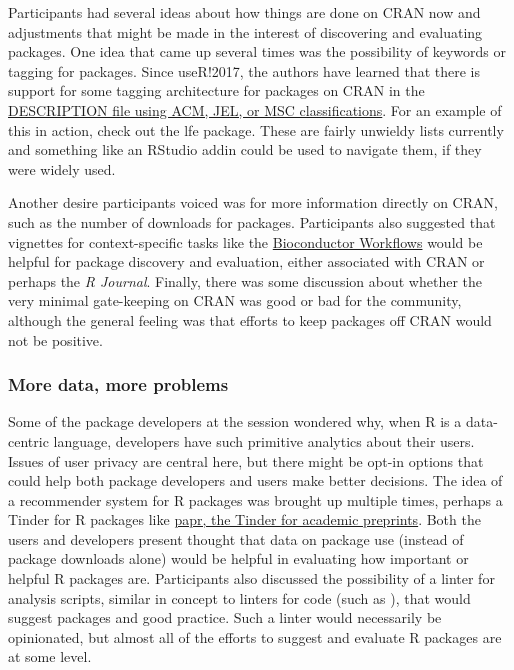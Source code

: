 Participants had several ideas about how things are done on CRAN now and
adjustments that might be made in the interest of discovering and
evaluating packages. One idea that came up several times was the
possibility of keywords or tagging for packages. Since useR!2017, the
authors have learned that there is support for some tagging architecture
for packages on CRAN in the
\href{https://cran.r-project.org/doc/manuals/r-release/R-exts.html\#The-DESCRIPTION-file}{DESCRIPTION
file using ACM, JEL, or MSC classifications}. For an example of this in
action, check out the lfe \citep{lfe} package. These are fairly unwieldy
lists currently and something like an RStudio addin could be used to
navigate them, if they were widely used.

Another desire participants voiced was for more information directly on
CRAN, such as the number of downloads for packages. Participants also
suggested that vignettes for context-specific tasks like the
\href{https://www.bioconductor.org/help/workflows/}{Bioconductor
Workflows} would be helpful for package discovery and evaluation, either
associated with CRAN or perhaps the \emph{R Journal}. Finally, there was
some discussion about whether the very minimal gate-keeping on CRAN was
good or bad for the community, although the general feeling was that
efforts to keep packages off CRAN would not be positive.

\subsubsection{More data, more problems}\label{more-data-more-problems}

Some of the package developers at the session wondered why, when R is a
data-centric language, developers have such primitive analytics about
their users. Issues of user privacy are central here, but there might be
opt-in options that could help both package developers and users make
better decisions. The idea of a recommender system for R packages was
brought up multiple times, perhaps a Tinder for R packages like
\href{https://simplystatistics.org/2016/10/03/papr/}{papr, the Tinder
for academic preprints}. Both the users and developers present thought
that data on package use (instead of package downloads alone) would be
helpful in evaluating how important or helpful R packages are.
Participants also discussed the possibility of a linter for analysis
scripts, similar in concept to linters for code (such as \citet{lintr}),
that would suggest packages and good practice. Such a linter would
necessarily be opinionated, but almost all of the efforts to suggest and
evaluate R packages are at some level.

